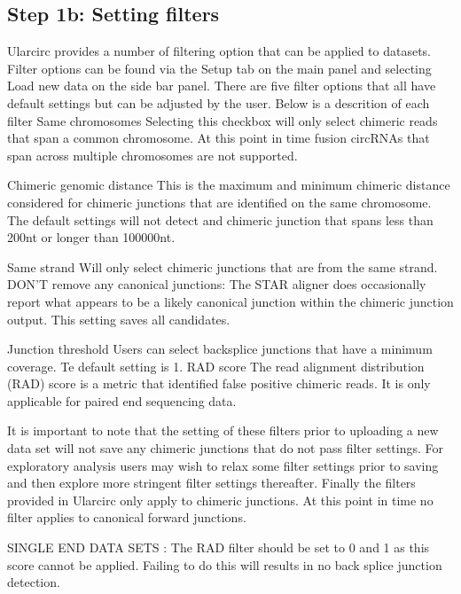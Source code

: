 \documentclass[12pt]{article}
\begin{document}
\subsection{Step 1b: Setting filters} \label{sec:Step1b}
Ularcirc provides a number of filtering option that can be applied to datasets. Filter options can be found via the Setup tab on the main panel and selecting Load new data on the side bar panel. There are five filter options that all have default settings but can be adjusted by the user. Below is a descrition of each filter
 Same chromosomes  Selecting this checkbox will only select chimeric reads that span a common chromosome. At this point in time fusion circRNAs that span across multiple chromosomes are not supported. \par
Chimeric genomic distance   This is the maximum and minimum chimeric distance considered for chimeric junctions that are identified on the same chromosome. The default settings will not detect and chimeric junction that spans less than 200nt or longer than 100000nt. \par
 Same strand Will only select chimeric junctions that are from the same strand.
 DON'T remove any canonical junctions: The STAR aligner does occasionally report what appears to be a likely canonical junction within the chimeric junction output. This setting saves all candidates. \par
 Junction threshold Users can select backsplice junctions that have a minimum coverage. Te default setting is 1.
 RAD score The read alignment distribution (RAD) score is a metric that identified false positive chimeric reads. It is only applicable for paired end sequencing data. \par

It is important to note that the setting of these filters prior to uploading a new data set will not save  any chimeric junctions that do not pass filter settings. For exploratory analysis users may wish to relax some filter settings prior to saving and then explore more stringent filter settings thereafter. Finally the filters provided in Ularcirc only apply to chimeric junctions. At this point in time no filter applies to canonical forward junctions. \par

SINGLE END DATA SETS : The RAD filter should be set to 0 and 1 as this score cannot be applied. Failing to do this will results in no back splice junction detection.


\end{document}
